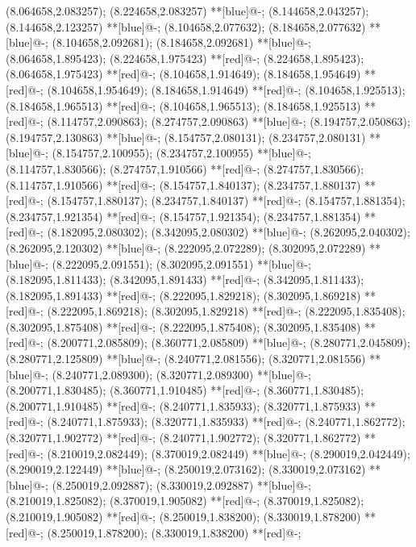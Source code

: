 (8.064658,2.083257); (8.224658,2.083257) **[blue]@{-};
(8.144658,2.043257); (8.144658,2.123257) **[blue]@{-};
(8.104658,2.077632); (8.184658,2.077632) **[blue]@{-};
(8.104658,2.092681); (8.184658,2.092681) **[blue]@{-};
(8.064658,1.895423); (8.224658,1.975423) **[red]@{-};
(8.224658,1.895423); (8.064658,1.975423) **[red]@{-};
(8.104658,1.914649); (8.184658,1.954649) **[red]@{-};
(8.104658,1.954649); (8.184658,1.914649) **[red]@{-};
(8.104658,1.925513); (8.184658,1.965513) **[red]@{-};
(8.104658,1.965513); (8.184658,1.925513) **[red]@{-};
(8.114757,2.090863); (8.274757,2.090863) **[blue]@{-};
(8.194757,2.050863); (8.194757,2.130863) **[blue]@{-};
(8.154757,2.080131); (8.234757,2.080131) **[blue]@{-};
(8.154757,2.100955); (8.234757,2.100955) **[blue]@{-};
(8.114757,1.830566); (8.274757,1.910566) **[red]@{-};
(8.274757,1.830566); (8.114757,1.910566) **[red]@{-};
(8.154757,1.840137); (8.234757,1.880137) **[red]@{-};
(8.154757,1.880137); (8.234757,1.840137) **[red]@{-};
(8.154757,1.881354); (8.234757,1.921354) **[red]@{-};
(8.154757,1.921354); (8.234757,1.881354) **[red]@{-};
(8.182095,2.080302); (8.342095,2.080302) **[blue]@{-};
(8.262095,2.040302); (8.262095,2.120302) **[blue]@{-};
(8.222095,2.072289); (8.302095,2.072289) **[blue]@{-};
(8.222095,2.091551); (8.302095,2.091551) **[blue]@{-};
(8.182095,1.811433); (8.342095,1.891433) **[red]@{-};
(8.342095,1.811433); (8.182095,1.891433) **[red]@{-};
(8.222095,1.829218); (8.302095,1.869218) **[red]@{-};
(8.222095,1.869218); (8.302095,1.829218) **[red]@{-};
(8.222095,1.835408); (8.302095,1.875408) **[red]@{-};
(8.222095,1.875408); (8.302095,1.835408) **[red]@{-};
(8.200771,2.085809); (8.360771,2.085809) **[blue]@{-};
(8.280771,2.045809); (8.280771,2.125809) **[blue]@{-};
(8.240771,2.081556); (8.320771,2.081556) **[blue]@{-};
(8.240771,2.089300); (8.320771,2.089300) **[blue]@{-};
(8.200771,1.830485); (8.360771,1.910485) **[red]@{-};
(8.360771,1.830485); (8.200771,1.910485) **[red]@{-};
(8.240771,1.835933); (8.320771,1.875933) **[red]@{-};
(8.240771,1.875933); (8.320771,1.835933) **[red]@{-};
(8.240771,1.862772); (8.320771,1.902772) **[red]@{-};
(8.240771,1.902772); (8.320771,1.862772) **[red]@{-};
(8.210019,2.082449); (8.370019,2.082449) **[blue]@{-};
(8.290019,2.042449); (8.290019,2.122449) **[blue]@{-};
(8.250019,2.073162); (8.330019,2.073162) **[blue]@{-};
(8.250019,2.092887); (8.330019,2.092887) **[blue]@{-};
(8.210019,1.825082); (8.370019,1.905082) **[red]@{-};
(8.370019,1.825082); (8.210019,1.905082) **[red]@{-};
(8.250019,1.838200); (8.330019,1.878200) **[red]@{-};
(8.250019,1.878200); (8.330019,1.838200) **[red]@{-};
